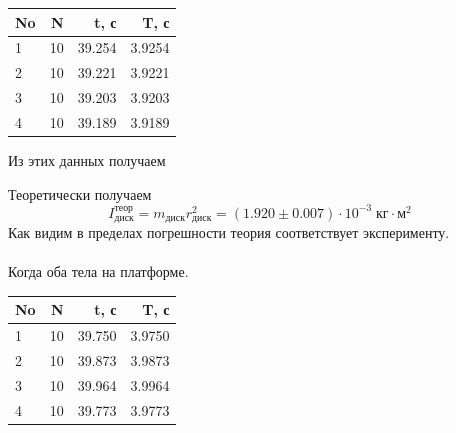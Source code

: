 \documentclass[a4, 12pt]{article}
\begin{document}
\begin{enumerate}
    \begin{table}[h!]
    \begin{center}
    \begin{tabular}{|l|r|r|r|}
    \hline
    No &   N &       t, с &         T, с \\
    \hline
    1  &  10 &  39.254 &  3.9254 \\
    2  &  10 &  39.221 &  3.9221 \\
    3  &  10 &  39.203 &  3.9203 \\
    4  &  10 &  39.189 &  3.9189 \\
    \hline
    \end{tabular}
    \end{center}
    \end{table}
    Из этих данных получаем



    Теоретически получаем
    \[I^{теор}_{диск} = m_{диск}r_{диск}^2 = (1.920 \pm 0.007)\cdot10^{-3}\;\text{кг}\cdot\text{м}^2\]
    Как видим в пределах погрешности теория соответствует эксперименту.

    \paragraph{}
    Когда оба тела на платформе.

    \begin{table}[h!]
    \begin{center}
    \begin{tabular}{|l|r|r|r|}
    \hline
    No &   N &       t, с &         T, с \\
    \hline
    1  &  10 &  39.750 &  3.9750 \\
    2  &  10 &  39.873 &  3.9873 \\
    3  &  10 &  39.964 &  3.9964 \\
    4  &  10 &  39.773 &  3.9773 \\
    \hline
    \end{tabular}
    \end{center}
    \end{table}


\end{enumerate}
\end{document}
